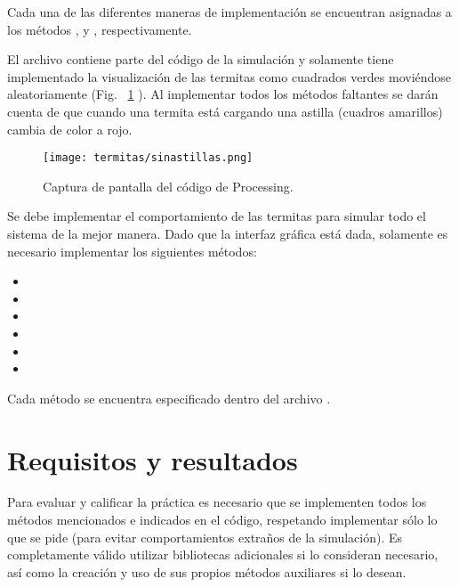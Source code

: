 Cada una de las diferentes maneras de implementación se encuentran asignadas a los métodos ,  y , respectivamente.

El archivo  contiene parte del código de la simulación y solamente tiene implementado la visualización de las termitas como cuadrados verdes moviéndose aleatoriamente (Fig. ~\ref{fig:sinastillas} ). Al implementar todos los métodos faltantes se darán cuenta de que cuando una termita está cargando una astilla (cuadros amarillos) cambia de color a rojo.


\begin{figure}
  \centering
  \texttt{[image: termitas/sinastillas.png]}
  \caption{Captura de pantalla del código  de Processing.}
  \label{fig:sinastillas}
\end{figure}

Se debe implementar el comportamiento de las termitas para simular todo el sistema de la mejor manera. Dado que la interfaz gráfica está dada, solamente es necesario implementar los siguientes métodos:

\begin{itemize}
  \item {}
  \item {}
  \item {}
  \item {}
  \item {}
  \item {}
\end{itemize}

Cada método se encuentra especificado dentro del archivo .


\section{Requisitos y resultados}

Para evaluar y calificar la práctica es necesario que se implementen todos los métodos mencionados e indicados en el código, respetando implementar sólo lo que se pide (para evitar comportamientos extraños de la simulación).
Es completamente válido utilizar bibliotecas adicionales si lo consideran necesario, así como la creación y uso de sus propios métodos auxiliares si lo desean.


